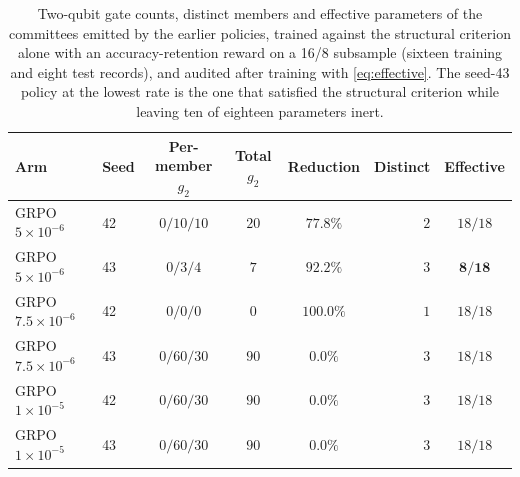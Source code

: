 \begin{table}[t]
\centering
\caption{Two-qubit gate counts, distinct members and effective parameters of the committees
emitted by the earlier policies, trained against the structural criterion alone with an
accuracy-retention reward on a 16/8 subsample (sixteen training and eight
test records), and audited after training with \eqref{eq:effective}. The seed-43 policy at the lowest rate is the one that satisfied the
structural criterion while leaving ten of eighteen parameters inert.}
\label{tab:compstructure-pre}
\begin{tabular}{@{}llcccrc@{}}
\toprule
Arm & Seed & Per-member $g_2$ & Total $g_2$ & Reduction & Distinct & Effective \\
\midrule
GRPO $5\times10^{-6}$ & 42 & $0/10/10$ & $20$ & $77.8\%$ & $2$ & $18/18$ \\
GRPO $5\times10^{-6}$ & 43 & $0/3/4$ & $7$ & $92.2\%$ & $3$ & $\mathbf{8/18}$ \\
GRPO $7.5\times10^{-6}$ & 42 & $0/0/0$ & $0$ & $100.0\%$ & $1$ & $18/18$ \\
GRPO $7.5\times10^{-6}$ & 43 & $0/60/30$ & $90$ & $0.0\%$ & $3$ & $18/18$ \\
GRPO $1\times10^{-5}$ & 42 & $0/60/30$ & $90$ & $0.0\%$ & $3$ & $18/18$ \\
GRPO $1\times10^{-5}$ & 43 & $0/60/30$ & $90$ & $0.0\%$ & $3$ & $18/18$ \\
\bottomrule
\end{tabular}
\end{table}
